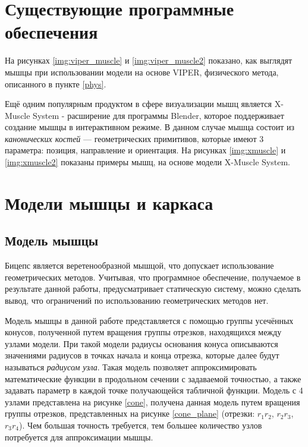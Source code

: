 \section{Существующие программные обеспечения}

На рисунках \ref{img:viper_muscle} и \ref{img:viper_muscle2} показано, как выглядят мышцы при использовании модели на основе VIPER, физического метода, описанного в пункте \ref{phys}.


Ещё одним популярным продуктом в сфере визуализации мышц является X-Muscle System\cite{xms} - расширение для программы Blender\cite{blender}, которое поддерживает создание мышцы в интерактивном режиме. В данном случае мышца состоит из \textit{канонических костей} --- геометрических примитивов, которые имеют 3 параметра: позиция, направление и ориентация. На рисунках \ref{img:xmuscle} и \ref{img:xmuscle2} показаны примеры мышц, на основе модели X-Muscle System.


\section{Модели мышцы и каркаса}

\subsection{Модель мышцы}

Бицепс является веретенообразной мышцой\cite{bio}, что допускает использование геометрических методов. Учитывая, что программное обеспечение, получаемое в результате данной работы, предусматривает статическую систему, можно сделать вывод, что ограничений по использованию геометрических методов нет\cite{cgv}.

Модель мышцы в данной работе представляется с помощью группы усечённых конусов, полученной путем вращения группы отрезков, находящихся между узлами модели. При такой модели радиусы основания конуса описываются значениями радиусов в точках начала и конца отрезка, которые далее будут называться \textit{радиусом узла}. Такая модель позволяет аппроксимировать математические функции в продольном сечении с задаваемой точностью, а также задавать параметр в каждой точке получающейся табличной функции. Модель с 4 узлами представлена на рисунке \ref{cone}, получена данная модель путем вращения группы отрезков, представленных на рисунке \ref{cone_plane} (отрезки: $r_1r_2$, $r_2r_3$, $r_3r_4$). Чем большая точность требуется, тем большее количество узлов потребуется для аппроксимации мышцы.

